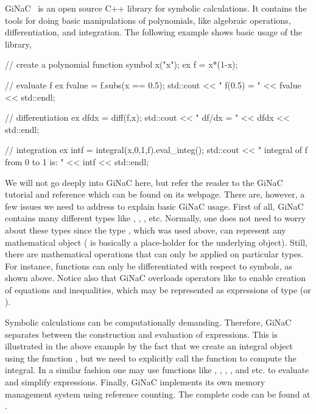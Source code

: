 GiNaC~\citep{BauerFrinkKreckel2000} is an open source C++ library
for symbolic calculations.  It contains the tools for doing basic
manipulations of polynomials, like algebraic operations, differentiation,
and integration.  The following example shows basic usage of the library,
\begin{c++}
// create a polynomial function
symbol x("x");
ex f = x*(1-x);

// evaluate f
ex fvalue = f.subs(x == 0.5);
std::cout << " f(0.5) = " << fvalue << std::endl;

// differentiation
ex dfdx  = diff(f,x);
std::cout << " df/dx = " << dfdx << std::endl;

// integration
ex intf  = integral(x,0,1,f).eval_integ();
std::cout << " integral of f from 0 to 1 is: " << intf << std::endl;
\end{c++}
We will not go deeply into GiNaC here, but refer the reader to the
GiNaC tutorial and reference which can be found on its webpage. There
are, however, a few issues we need to address to explain basic
GiNaC usage. First of all, GiNaC contains many different types like
, , , etc.  Normally, one does not
need to worry about these types since the type , which was used
above, can represent any mathematical object ( is basically a
place-holder for the underlying object). Still, there are mathematical
operations that can only be applied on particular types. For instance,
functions can only be differentiated with respect to symbols, as shown
above.  Notice also that GiNaC overloads operators like \emp{==} to
enable creation of equations and inequalities, which may be represented
as expressions of type  (or ).

Symbolic calculations can be computationally demanding. Therefore, GiNaC
separates between the construction and evaluation of expressions. This is
illustrated in the above example by the fact that we create an integral
object using the function , but we need to explicitly call
the function  to compute the integral. In a similar
fashion one may use functions like , , ,
, and  etc. to evaluate
and simplify expressions.  Finally, GiNaC implements its own memory
management system using reference counting.  The complete code can be
found at .

